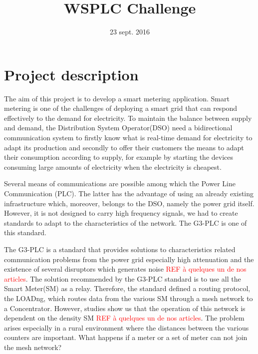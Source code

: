 \documentclass[a4paper,10pt]{article}
\title{WSPLC Challenge}
\author{}
\date{23 sept. 2016}
\newcommand{\FIXME}[1]{\textcolor{red}{\framebox{FIXME:} #1}}
\newcommand{\TODO}[1]{\textcolor{red}{\framebox{TODO:} #1}}
\begin{document}

\section{Project description}


The aim of this project is to develop a smart metering
application. Smart metering is one of the challenges of
deploying a smart grid that can respond effectively to the
demand for electricity. To maintain the balance between
supply and demand, the Distribution System Operator(DSO)
need a bidirectional communication system to firstly know
what is real-time demand for electricity to adapt its
production and secondly to offer their customers the means
to adapt their consumption according to supply, for example
by starting the devices consuming large amounts of
electricity when the electricity is cheapest.

Several means of communications are possible among which the
Power Line Communication (PLC). The latter has the advantage
of using an already existing infrastructure which, moreover,
belongs to the DSO, namely the power grid itself. However,
it is not designed to carry high frequency signals, we had
to create standards to adapt to the characteristics of the
network. The G3-PLC is one of this standard.

The G3-PLC is a standard that provides solutions to
characteristics related communication problems from the
power grid especially high attenuation and the existence of
several disruptors which generates noise \FIXME{REF à
  quelques un de nos articles}. The solution recommended by
the G3-PLC standard is to use all the Smart Meter(SM) as a
relay. Therefore, the standard defined a routing protocol,
the LOADng, which routes data from the various SM through a
mesh network to a Concentrator. However, studies show us
that the operation of this network is dependent on the
density SM \FIXME{REF à quelques un de nos articles}. The problem
arises especially in a rural environment where the distances
between the various counters are important. What happens if
a meter or a set of meter can not join the mesh network?
\end{document}
